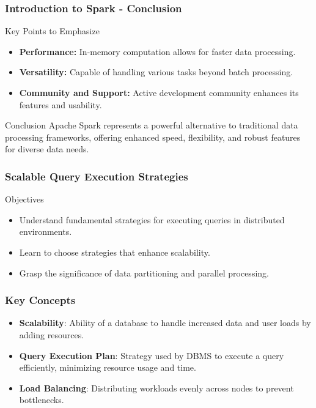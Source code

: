 \documentclass[aspectratio=169]{beamer}
\begin{document}
\begin{frame}[fragile]
    \frametitle{Introduction to Spark - Conclusion}
    \begin{block}{Key Points to Emphasize}
        \begin{itemize}
            \item \textbf{Performance:} In-memory computation allows for faster data processing.
            \item \textbf{Versatility:} Capable of handling various tasks beyond batch processing.
            \item \textbf{Community and Support:} Active development community enhances its features and usability.
        \end{itemize}
    \end{block}
    \begin{block}{Conclusion}
        Apache Spark represents a powerful alternative to traditional data processing frameworks, offering enhanced speed, flexibility, and robust features for diverse data needs.
    \end{block}
\end{frame}

\begin{frame}[fragile]
    \frametitle{Scalable Query Execution Strategies}
    
    \begin{block}{Objectives}
        \begin{itemize}
            \item Understand fundamental strategies for executing queries in distributed environments.
            \item Learn to choose strategies that enhance scalability.
            \item Grasp the significance of data partitioning and parallel processing.
        \end{itemize}
    \end{block}
    
\end{frame}

\begin{frame}[fragile]
    \frametitle{Key Concepts}
    
    \begin{itemize}
        \item \textbf{Scalability}: Ability of a database to handle increased data and user loads by adding resources.
        \item \textbf{Query Execution Plan}: Strategy used by DBMS to execute a query efficiently, minimizing resource usage and time.
        \item \textbf{Load Balancing}: Distributing workloads evenly across nodes to prevent bottlenecks.
    \end{itemize}
    
\end{frame}
\end{document}
